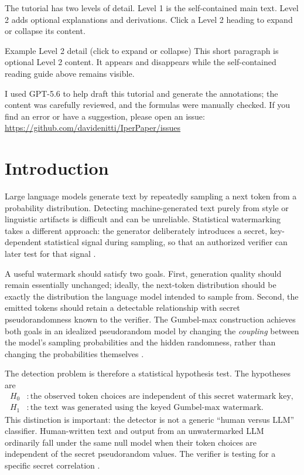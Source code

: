 \documentclass[11pt]{article}
\begin{document}
The tutorial has two levels of detail. Level 1 is the self-contained main text. Level 2 adds optional explanations and derivations. Click a Level 2 heading to expand or collapse its content.

\begin{leveltwo}{Example Level 2 detail (click to expand or collapse)}
This short paragraph is optional Level 2 content.
It appears and disappears while the self-contained reading guide above remains visible.
\end{leveltwo}

I used GPT-5.6 to help draft this tutorial and generate the annotations; the content was carefully reviewed, and the formulas were manually checked. If you find an error or have a suggestion, please open an issue: \url{https://github.com/davidenitti/IperPaper/issues}

\section{Introduction}

Large language models generate text by repeatedly sampling a next token from a probability distribution. Detecting machine-generated text purely from style or linguistic artifacts is difficult and can be unreliable. Statistical watermarking takes a different approach: the generator deliberately introduces a secret, key-dependent statistical signal during sampling, so that an authorized verifier can later test for that signal \cite{aaronson2022,li2025}.

A useful watermark should satisfy two goals. First, generation quality should remain essentially unchanged; ideally, the next-token distribution should be exactly the distribution the language model intended to sample from. Second, the emitted tokens should retain a detectable relationship with secret pseudorandomness known to the verifier. The Gumbel-max construction achieves both goals in an idealized pseudorandom model by changing the \emph{coupling} between the model's sampling probabilities and the hidden randomness, rather than changing the probabilities themselves \cite{aaronson2022,li2025}.

The detection problem is therefore a statistical hypothesis test. The hypotheses are
\begin{align*}
H_0 &: \text{the observed token choices are independent of this secret watermark key},\\
H_1 &: \text{the text was generated using the keyed Gumbel-max watermark}.
\end{align*}
This distinction is important: the detector is not a generic ``human versus LLM'' classifier. Human-written text and output from an unwatermarked LLM ordinarily fall under the same null model when their token choices are independent of the secret pseudorandom values. The verifier is testing for a specific secret correlation \cite{li2025}.
\end{document}
